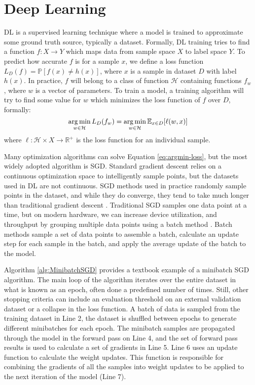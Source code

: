 \section{Deep Learning}
DL is a supervised learning technique where a model is trained to approximate some ground truth source, typically a dataset.
Formally, \gls{DL} training tries to find a function $f: X\longrightarrow Y$ which maps data from sample space $X$ to label space $Y$.
To predict how accurate $f$ is for a sample $x$, we define a loss function \\ $L_D(f)=\mathbb{P}[f(x)\neq h(x)]$, where $x$ is a sample in dataset $D$ with label $h(x)$.
In practice, $f$ will belong to a class of function $\mathcal{H}$ containing functions $f_w$, where $w$ is a vector of parameters.
To train a model, a training algorithm will try to find some value for $w$ which minimizes the loss function of $f$ over $D$, formally:
\begin{equation}
    \operatorname*{arg\,min}_{w\in\mathcal{H}} L_D(f_w) = \operatorname*{arg\,min}_{w\in\mathcal{H}} \mathbb{E}_{x\in D}[\ell (w,x)]
    \label{eq:argmin-loss}
\end{equation} 
where $\ell:\mathcal{H}\times X\longrightarrow \mathbb{R}^+$ is the loss function for an individual sample. 

Many optimization algorithms can solve Equation \ref{eq:argmin-loss}, but the most widely adopted algorithm is \gls{SGD}.
Standard gradient descent relies on a continuous optimization space to intelligently sample points, but the datasets used in \gls{DL} are not continuous.
SGD methods used in practice randomly sample points in the dataset, and while they do converge, they tend to take much longer than traditional gradient descent \cite{Robbins1951StochasticAproxmethod}.
Traditional \gls{SGD} samples one data point at a time, but on modern hardware, we can increase device utilization, and throughput by grouping multiple data points using a batch method \cite{Le2011OnOptMethodsforDL}.
Batch methods sample a set of data points to assemble a batch, calculate an update step for each sample in the batch, and apply the average update of the batch to the model. 



Algorithm \ref{alg:MinibatchSGD} provides a textbook example of a minibatch \gls{SGD} algorithm.
The main loop of the algorithm iterates over the entire dataset in what is known as an epoch, often done a predefined number of times. 
Still, other stopping criteria can include an evaluation threshold on an external validation dataset or a collapse in the loss function.
A batch of data is sampled from the training dataset in Line 2, the dataset is shuffled between epochs to generate different minibatches for each epoch.
The minibatch samples are propagated through the model in the forward pass on Line 4, and the set of forward pass results is used to calculate a set of gradients in Line 5. 
Line 6 uses an update function to calculate the weight updates.
This function is responsible for combining the gradients of all the samples into weight updates to be applied to the next iteration of the model (Line 7).

